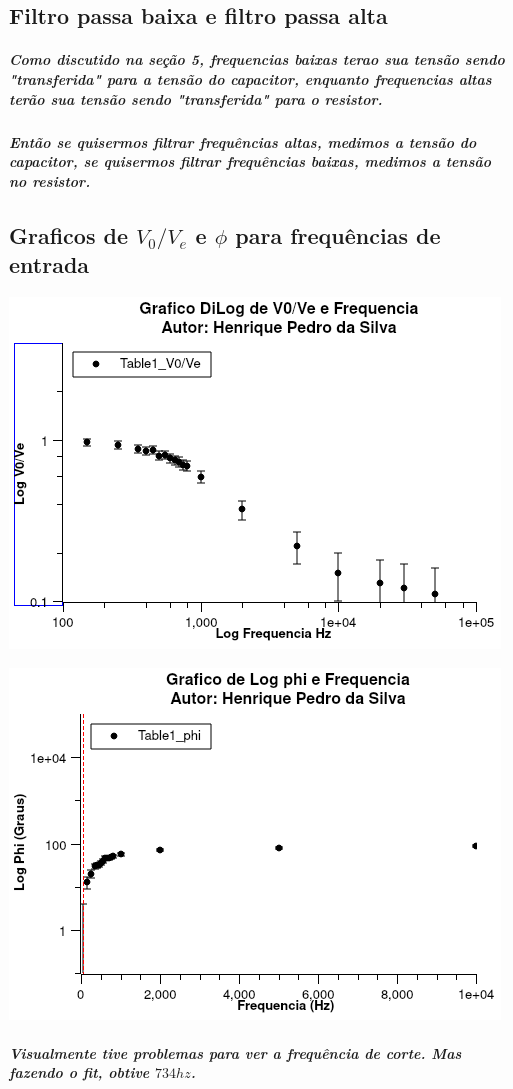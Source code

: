 \documentclass[12pt,twoside, a4paper, twocolumn]{article}
\begin{document}
\subsection{Filtro passa baixa e filtro passa alta}

\subparagraph*{Como discutido na seção 5, frequencias baixas terao sua tensão sendo "transferida" para a tensão do capacitor, enquanto frequencias altas terão sua tensão sendo "transferida" para o resistor.}

\subparagraph*{Então se quisermos filtrar frequências altas, medimos a tensão do capacitor, se quisermos filtrar frequências baixas, medimos a tensão no resistor.}

\subsection{Graficos de $V_0/V_e$ e $\phi$ para frequências de entrada}

\begin{adjustbox}{scale=0.70}
  \includegraphics{Graph1.png}
\end{adjustbox}

\begin{adjustbox}{scale=0.70}
  \includegraphics{Graph2.png}
\end{adjustbox}

\subparagraph*{Visualmente tive problemas para ver a frequência de corte. Mas fazendo o fit, obtive $734hz$.}
\end{document}
